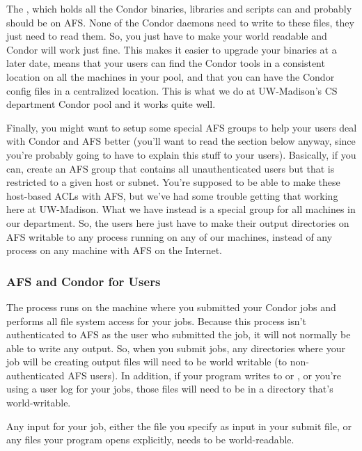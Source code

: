 The , which holds all the Condor binaries,
libraries and scripts can and probably should be on AFS.  None of the
Condor daemons need to write to these files, they just need to read
them.  So, you just have to make your  world
readable and Condor will work just fine.  This makes it easier to
upgrade your binaries at a later date, means that your users can find
the Condor tools in a consistent location on all the machines in your
pool, and that you can have the Condor config files in a centralized
location.  This is what we do at UW-Madison's CS department Condor
pool and it works quite well.

Finally, you might want to setup some special AFS groups to help your
users deal with Condor and AFS better (you'll want to read the section
below anyway, since you're probably going to have to explain this
stuff to your users).  Basically, if you can, create an AFS group that
contains all unauthenticated users but that is restricted to a given
host or subnet.  You're supposed to be able to make these host-based
ACLs with AFS, but we've had some trouble getting that working here at
UW-Madison.  What we have instead is a special group for all machines
in our department.  So, the users here just have to make their output
directories on AFS writable to any process running on any of our
machines, instead of any process on any machine with AFS on the
Internet.

\subsubsection{\label{sec:Condor-AFS-Users}AFS and Condor for Users}

The  process runs on the machine where you submitted
your Condor jobs and performs all file system access for your jobs.
Because this process isn't authenticated to AFS as the user who
submitted the job, it will not normally be able to write any output.
So, when you submit jobs, any directories where your job will be
creating output files will need to be world writable (to
non-authenticated AFS users).  In addition, if your program writes to
 or , or you're using a user log for your
jobs, those files will need to be in a directory that's
world-writable.

Any input for your job, either the file you specify as input in your
submit file, or any files your program opens explicitly, needs to be
world-readable.

